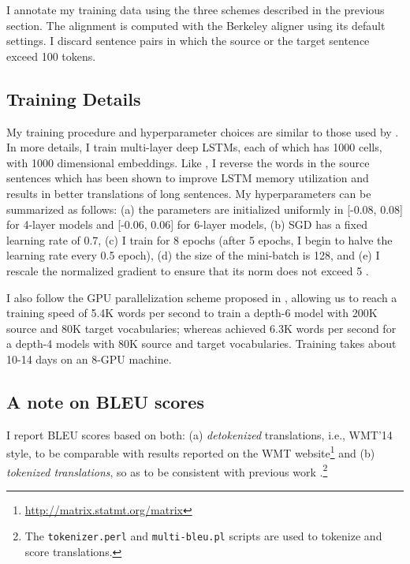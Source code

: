I annotate my training data using the three schemes described in the previous section. The alignment 
is computed with the Berkeley aligner \cite{liang06alignment} using its default settings.
I discard sentence pairs in which the source or the target sentence exceed 100 tokens.

\subsection{Training Details}
\label{subsec:train_details}
\begin{sloppypar}
My training procedure and hyperparameter choices are similar to those used by
. In more details, I train multi-layer deep LSTMs, each of which has 
1000 cells, with 1000 dimensional embeddings. Like , 
I reverse the words in the source sentences which 
has been shown to improve LSTM memory utilization and results in better translations of long sentences. 
My hyperparameters can be summarized as follows: (a) the parameters are initialized uniformly  
in [-0.08, 0.08] for 4-layer models and [-0.06, 0.06] for 6-layer models, (b) SGD has a fixed learning rate of 0.7, (c) I train for 8 epochs (after
5 epochs, I begin to halve the learning rate every 0.5 epoch), (d) the size of the mini-batch is 128, 
and (e) I rescale the normalized gradient to ensure that its norm does not
exceed 5 \cite{pascanu13}.
\end{sloppypar}

I also follow the GPU parallelization scheme proposed in \cite{sutskever14}, allowing us to  
reach a training speed of 5.4K words per second to train a depth-6 model with 200K source and 80K target vocabularies; whereas  achieved 6.3K words per 
second for a depth-4 models with 80K source and target vocabularies.
Training takes about 10-14 days on an 8-GPU machine.

\subsection{A note on BLEU scores}
I report BLEU scores based on both: (a) {\it detokenized} translations, i.e., WMT'14 style, to be comparable with results reported on the WMT website\footnote{\url{http://matrix.statmt.org/matrix}} and (b) {\it tokenized translations}, so as to be consistent with previous work \cite{cho14,bog15,wmt14_en_fr,sutskever14,jean15}.\footnote{The \texttt{tokenizer.perl} and \texttt{multi-bleu.pl} scripts are used to tokenize and score translations.}

